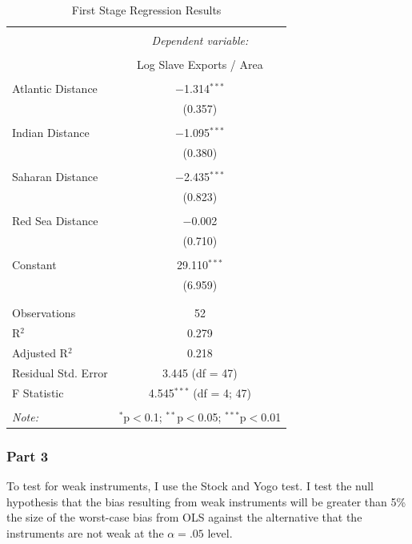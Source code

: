 \documentclass{article}\usepackage[]{graphicx}\usepackage[]{color}
\begin{document}
\begin{table}[H] \centering 
  \caption{First Stage Regression Results} 
  \label{} 
\begin{tabular}{@{\extracolsep{5pt}}lc} 
\\[-1.8ex]\hline 
\hline \\[-1.8ex] 
 & \multicolumn{1}{c}{\textit{Dependent variable:}} \\ 
\cline{2-2} 
\\[-1.8ex] & Log Slave Exports / Area \\ 
\hline \\[-1.8ex] 
 Atlantic Distance & $-$1.314$^{***}$ \\ 
  & (0.357) \\ 
  & \\ 
 Indian Distance & $-$1.095$^{***}$ \\ 
  & (0.380) \\ 
  & \\ 
 Saharan Distance & $-$2.435$^{***}$ \\ 
  & (0.823) \\ 
  & \\ 
 Red Sea Distance & $-$0.002 \\ 
  & (0.710) \\ 
  & \\ 
 Constant & 29.110$^{***}$ \\ 
  & (6.959) \\ 
  & \\ 
\hline \\[-1.8ex] 
Observations & 52 \\ 
R$^{2}$ & 0.279 \\ 
Adjusted R$^{2}$ & 0.218 \\ 
Residual Std. Error & 3.445 (df = 47) \\ 
F Statistic & 4.545$^{***}$ (df = 4; 47) \\ 
\hline 
\hline \\[-1.8ex] 
\textit{Note:}  & \multicolumn{1}{r}{$^{*}$p$<$0.1; $^{**}$p$<$0.05; $^{***}$p$<$0.01} \\ 
\end{tabular} 
\end{table} 


\subsubsection{Part 3}


To test for weak instruments, I use the Stock and Yogo \parencite[][]{Stock_2005} test.
I test the null hypothesis that the bias resulting from weak instruments will be greater than 5\% the size of the worst-case bias from OLS against the alternative that the instruments are not weak at the  $\alpha=.05$ level.
\end{document}
